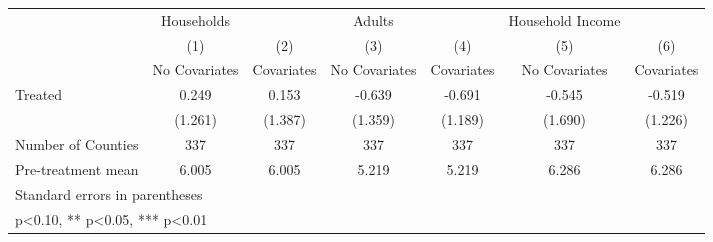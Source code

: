 {
\def\sym#1{\ifmmode^{#1}\else\(^{#1}\)\fi}
\begin{tabular}{l*{6}{c}}
\hline\hline
            &  Households   &               &      Adults   &               &Household Income   &               \\
            &\multicolumn{1}{c}{(1)}&\multicolumn{1}{c}{(2)}&\multicolumn{1}{c}{(3)}&\multicolumn{1}{c}{(4)}&\multicolumn{1}{c}{(5)}&\multicolumn{1}{c}{(6)}\\
            &\multicolumn{1}{c}{No Covariates}&\multicolumn{1}{c}{Covariates}&\multicolumn{1}{c}{No Covariates}&\multicolumn{1}{c}{Covariates}&\multicolumn{1}{c}{No Covariates}&\multicolumn{1}{c}{Covariates}\\
\hline
Treated     &       0.249   &       0.153   &      -0.639   &      -0.691   &      -0.545   &      -0.519   \\
            &     (1.261)   &     (1.387)   &     (1.359)   &     (1.189)   &     (1.690)   &     (1.226)   \\
\hline
Number of Counties&         337   &         337   &         337   &         337   &         337   &         337   \\
Pre-treatment mean&       6.005   &       6.005   &       5.219   &       5.219   &       6.286   &       6.286   \\
\hline\hline
\multicolumn{7}{l}{\footnotesize Standard errors in parentheses}\\
\multicolumn{7}{l}{\footnotesize * p<0.10, ** p<0.05, *** p<0.01}\\
\end{tabular}
}
